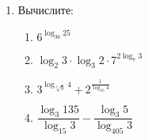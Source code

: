 \documentclass[12pt, a4paper]{article}
\begin{document}
\begin{enumerate}
	\item Вычислите:
	\begin{multicols}{2}
		\begin{enumerate}[label=\asbuk*)]
			\item $6^{\log_36 25}$
			\item $\log_2 3 \cdot \log_3 2 \cdot 7^{2\log_7 3}$
			\item $3^{\log_{\sqrt[3]{9}}4}+2^{\frac{1}{\log_16 4}}$
			\item $\dfrac{\log_3 135}{\log_15 3}-\dfrac{\log_3 5}{\log_405 3}$
		\end{enumerate}
	\end{multicols}
\end{enumerate}
\end{document}
